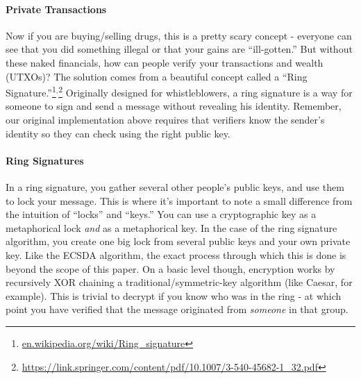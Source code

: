 \documentclass[12pt]{article}
\begin{document}
\clearpage

\paragraph{Private Transactions} Now if you are buying/selling drugs, this is a pretty scary concept - everyone can see that you did something illegal or that your gains are ``ill-gotten.'' But without these naked financials, how can people verify your transactions and wealth (UTXOs)? The solution comes from a beautiful concept called a 
``Ring Signature.''\footnote{\url{en.wikipedia.org/wiki/Ring_signature}}$^,$\footnote{\url{https://link.springer.com/content/pdf/10.1007/3-540-45682-1_32.pdf}} Originally designed for whistleblowers, a ring signature is a way for someone to sign and send a message without revealing his identity. Remember, our original implementation above requires that verifiers know the sender's identity so they can check using the right public key.

\paragraph{Ring Signatures} In a ring signature, you gather several other people's public keys, and use them to lock your message. This is where it's important to note a small difference from the intuition of ``locks'' and ``keys.'' You can use a cryptographic key as a metaphorical lock \emph{and} as a metaphorical key. In the case of the ring signature algorithm, you create one big lock from several public keys and your own private key. Like the ECSDA algorithm, the exact process through which this is done is beyond the scope of this paper. On a basic level though, encryption works by recursively XOR chaining a traditional/symmetric-key algorithm (like Caesar, for example). This is trivial to decrypt if you know who was in the ring - at which point you have verified that the message originated from \emph{someone} in that group.
\end{document}
